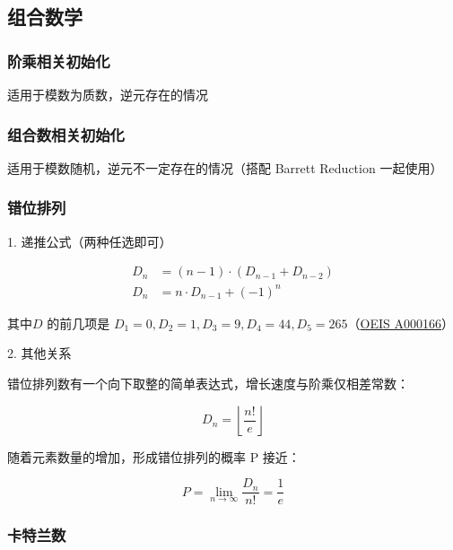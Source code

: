 \documentclass[12pt]{article}
\theoremstyle{definition}
\theoremstyle{remark}
\begin{document}


\newpage

\subsection{组合数学}

\subsubsection{阶乘相关初始化}

适用于模数为质数，逆元存在的情况



\newpage

\subsubsection{组合数相关初始化}

适用于模数随机，逆元不一定存在的情况（搭配 Barrett Reduction 一起使用）



\newpage

\subsubsection{错位排列}

1. 递推公式（两种任选即可）

$$
\begin{aligned}
	D_{n}&=(n-1)\cdot(D_{n-1}+D_{n-2})\\
	D_{n}&=n\cdot D_{n-1}+(-1)^{n}
\end{aligned}
$$

其中$D$ 的前几项是 $D_1=0, D_2=1, D_3=9, D_4=44, D_5=265 $（\href{http://oeis.org/A000166}{OEIS A000166}）

2. 其他关系

错位排列数有一个向下取整的简单表达式，增长速度与阶乘仅相差常数：

$$
D_n=\left\lfloor\frac{n!}{e}\right\rfloor
$$

随着元素数量的增加，形成错位排列的概率 P 接近：

$$
P=\lim_{n\to\infty}\frac{D_n}{n!}=\frac{1}{e}
$$

\subsubsection{卡特兰数}
\end{document}
